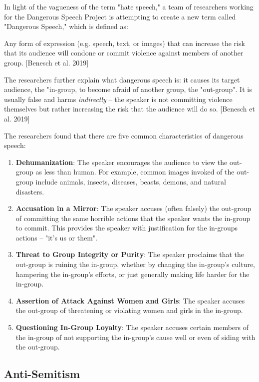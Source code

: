 \documentclass[class=book, crop=false]{standalone}
\begin{document}
In light of the vagueness of the term "hate speech," a team of researchers working for the Dangerous Speech Project is attempting to create a new term called "Dangerous Speech," which is defined as:

\begin{displayquote}
Any form of expression (e.g. speech, text, or images) that can increase the risk that its audience will condone or commit violence against members of another group. [Benesch et al. 2019]
\end{displayquote}

The researchers further explain what dangerous speech is: it causes its target audience, the "in-group, to become afraid of another group, the "out-group". It is usually false and harms \textit{indirectly} -- the speaker is not committing violence themselves but rather increasing the risk that the audience will do so. [Benesch et al. 2019]

The researchers found that there are five common characteristics of dangerous speech:
\begin{enumerate}
    \item \textbf{Dehumanization}: The speaker encourages the audience to view the out-group as less than human. For example, common images invoked of the out-group include animals, insects, diseases, beasts, demons, and natural disasters.
    \item \textbf{Accusation in a Mirror}: The speaker accuses (often falsely) the out-group of committing the same horrible actions that the speaker wants the in-group to commit. This provides the speaker with justification for the in-groups actions -- "it's us or them".
    \item \textbf{Threat to Group Integrity or Purity}: The speaker proclaims that the out-group is ruining the in-group, whether by changing the in-group's culture, hampering the in-group's efforts, or just generally making life harder for the in-group.
    \item \textbf{Assertion of Attack Against Women and Girls}: The speaker accuses the out-group of threatening or violating women and girls in the in-group.
    \item \textbf{Questioning In-Group Loyalty}: The speaker accuses certain members of the in-group of not supporting the in-group's cause well or even of siding with the out-group.
\end{enumerate}

\subsection{Anti-Semitism}
\end{document}
